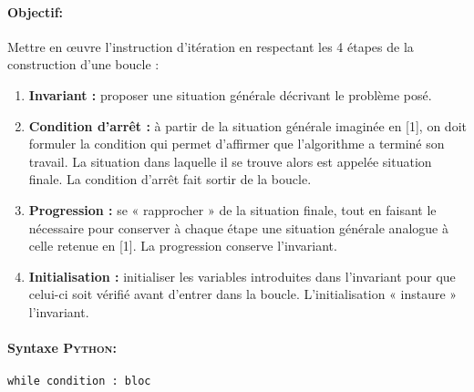 \documentclass[11pt,a4paper,colorlinks,breaklinks]{article}
\def\python{\textsc{Python}}
\begin{document}
\paragraph{Objectif:} Mettre en \oe uvre l'instruction d'itération
	en respectant les 4 étapes de la construction d'une boucle :
	\begin{enumerate}
	\item {\bf Invariant :} proposer une situation générale décrivant le problème posé. 
	\item {\bf Condition d'arrêt :} à  partir de la situation générale imaginée en [1], 
		on doit formuler la condition qui permet d'affirmer que l'algorithme a 
		terminé son travail. 
		La situation dans laquelle il se trouve alors est appelée situation finale.
		La condition d'arrêt fait sortir de la boucle.
	\item {\bf Progression :} se « rapprocher » de la situation finale, tout en faisant 
		le nécessaire pour conserver à  chaque étape une situation générale 
		analogue à  celle retenue en [1].
		La progression conserve l'invariant.
	\item {\bf Initialisation :} initialiser les variables introduites dans l'invariant 
		pour que celui-ci soit vérifié avant d'entrer dans la boucle.
		L'initialisation « instaure » l'invariant.
	\end{enumerate}

\paragraph{Syntaxe \python:} \texttt{while condition : bloc}
\end{document}
